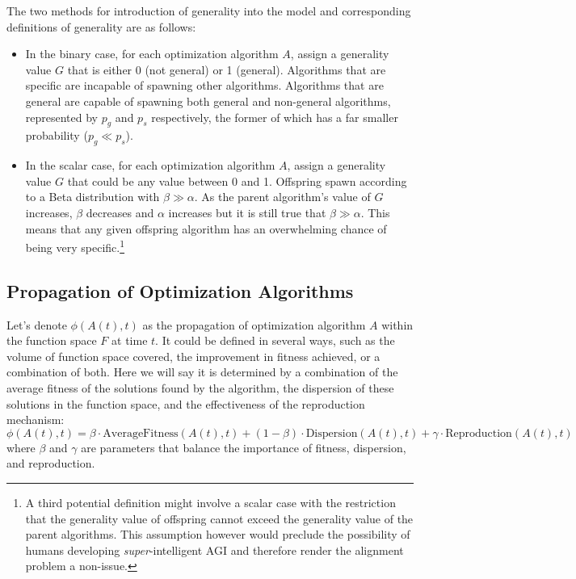 \documentclass{article}[10pt]
\begin{document}
The two methods for introduction of generality into the model and corresponding definitions of generality are as follows:
\begin{itemize}
    \item In the binary case, for each optimization algorithm $A$, assign a generality value $G$ that is either 0 (not general) or 1 (general).
    Algorithms that are specific are incapable of spawning other algorithms.
    Algorithms that are general are capable of spawning both general and non-general algorithms, represented by $p_g$ and $p_s$ respectively, the former of which has a far smaller probability ($p_g \ll p_s$).
    \item In the scalar case, for each optimization algorithm $A$, assign a generality value $G$ that could be any value between 0 and 1.
    Offspring spawn according to a Beta distribution with $\beta \gg \alpha$.
    As the parent algorithm's value of $G$ increases, $\beta$ decreases and $\alpha$ increases but it is still true that $\beta \gg \alpha$.
    This means that any given offspring algorithm has an overwhelming chance of being very specific.\footnote{
        A third potential definition might involve a scalar case with the restriction that the generality value of offspring cannot exceed the generality value of the parent algorithms.
        This assumption however would preclude the possibility of humans developing \textit{super}-intelligent AGI and therefore render the alignment problem a non-issue.
}
\end{itemize}



\subsection{Propagation of Optimization Algorithms}
\label{subsection:propogation}
Let's denote \( \phi(A(t), t) \) as the propagation of optimization algorithm \( A \) within the function space \( F \) at time \( t \). 
It could be defined in several ways, such as the volume of function space covered, the improvement in fitness achieved, or a combination of both.
Here we will say it is determined by a combination of the average fitness of the solutions found by the algorithm, the dispersion of these solutions in the function space, and the effectiveness of the reproduction mechanism:
\[
\phi(A(t), t) = \beta \cdot \text{AverageFitness}(A(t), t) + (1 - \beta) \cdot \text{Dispersion}(A(t), t) + \gamma \cdot \text{Reproduction}(A(t), t)
\]
where \( \beta \) and \( \gamma \) are parameters that balance the importance of fitness, dispersion, and reproduction. \par
\end{document}
